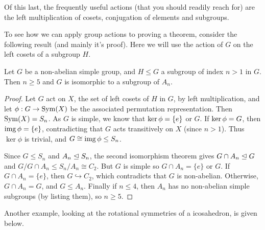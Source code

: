 \documentclass[a4paper]{scrartcl}
\begin{document}
Of this last, the frequently useful actions (that you should readily reach for) are the left multiplication of cosets, conjugation of elements and subgroups.


To see how we can apply group actions to proving a theorem, consider the following result (and mainly it's proof). Here we will use the action of $G$ on the left cosets of a subgroup $H$.

\begin{theorem}
	Let $G$ be a non-abelian simple group, and $H\leq G$ a subgroup of index $n > 1$ in $G$. Then $n \geq 5$ and $G$ is isomorphic to a subgroup of $A_n$.
\end{theorem}
\begin{proof}
	Let $G$ act on $X$, the set of left cosets of $H$ in $G$, by left multiplication, and let $\phi: G \rightarrow \operatorname{Sym}(X)$ be the associated permutation representation. Then $\operatorname{Sym}(X) = S_n$. As $G$ is simple, we know that $\operatorname{ker} \phi = \{e\}$ or $G$. If $\operatorname{ker} \phi = G$, then $\operatorname{img} \phi = \{e\}$, contradicting that $G$ acts transitively on $X$ (since $n > 1$). Thus $\ker \phi$ is trivial, and $G \cong \operatorname{img} \phi \leq S_n$.

	Since $G \leq S_n$ and $A_n \trianglelefteq S_n$, the second isomorphism theorem gives $G \cap A_n \trianglelefteq G$ and $G / G \cap A_n \leq S_n / A_n \cong C_2$. But $G$ is simple so $G \cap A_n = \{e\}$ or $G$. If $G \cap A_n = \{e\}$, then $G \hookrightarrow C_2$, which contradicts that $G$ is non-abelian. Otherwise, $G \cap A_n = G$, and $G \leq A_n$. Finally if $n \leq 4$, then $A_n$ has no non-abelian simple subgroups (by listing them), so $n \geq 5$.
\end{proof}

Another example, looking at the rotational symmetries of a icosahedron, is given below.
\end{document}
